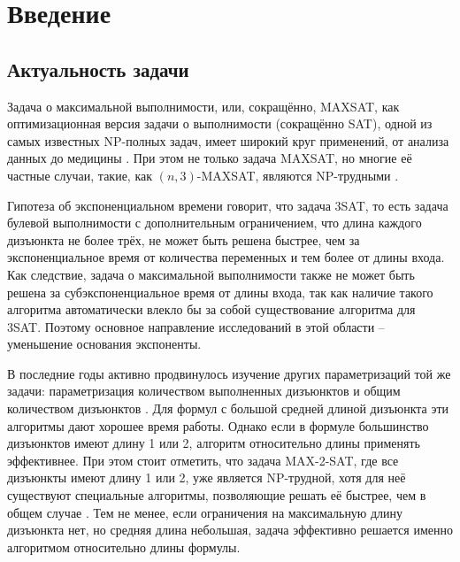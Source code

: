 
\section*{Введение}
\label{sec:intro}

\subsection*{Актуальность задачи}

\firstpar{}Задача о максимальной выполнимости, или, сокращённо, MAXSAT, как оптимизационная версия задачи о выполнимости (сокращённо SAT), одной из самых известных NP-полных задач, имеет широкий круг применений, от анализа данных \cite{berg2015applications} до медицины \cite{lin2012application}.
При этом не только задача MAXSAT, но многие её частные случаи, такие, как $(n,3)$-MAXSAT, являются NP-трудными \cite{raman1998simplified}.

Гипотеза об экспоненциальном времени говорит, что задача 3SAT, то есть задача булевой выполнимости с дополнительным ограничением, что длина каждого дизъюнкта не более трёх, не может быть решена быстрее, чем за экспоненциальное время от количества переменных и тем более от длины входа. Как следствие, задача о максимальной выполнимости также не может быть решена за субэкспоненциальное время от длины входа, так как наличие такого алгоритма автоматически влекло бы за собой существование алгоритма для 3SAT. Поэтому основное направление исследований в этой области -- уменьшение основания экспоненты.

В последние годы активно продвинулось изучение других параметризаций той же задачи: параметризация количеством выполненных дизъюнктов \cite{chen15} и общим количеством дизъюнктов \cite{xu19}. Для формул с большой средней длиной дизъюнкта эти алгоритмы дают хорошее время работы. Однако если в формуле большинство дизъюнктов имеют длину 1 или 2, алгоритм относительно длины применять эффективнее. При этом стоит отметить, что задача MAX-2-SAT, где все дизъюнкты имеют длину 1 или 2, уже является NP-трудной, хотя для неё существуют специальные алгоритмы, позволяющие решать её быстрее, чем в общем случае \cite{golovnev2014new}. Тем не менее, если ограничения на максимальную длину дизъюнкта нет, но средняя длина небольшая, задача эффективно решается именно алгоритмом относительно длины формулы.

